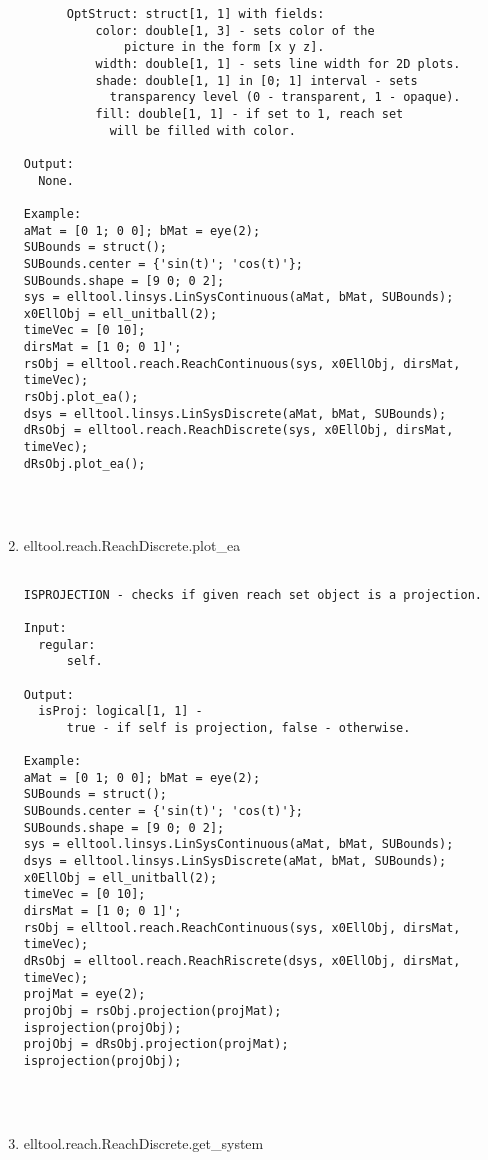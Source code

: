 \begin{enumerate}
\begin{lstlisting}
      OptStruct: struct[1, 1] with fields:
          color: double[1, 3] - sets color of the
              picture in the form [x y z].
          width: double[1, 1] - sets line width for 2D plots.
          shade: double[1, 1] in [0; 1] interval - sets
            transparency level (0 - transparent, 1 - opaque).
          fill: double[1, 1] - if set to 1, reach set
            will be filled with color.

Output:
  None.

Example:
aMat = [0 1; 0 0]; bMat = eye(2);
SUBounds = struct();
SUBounds.center = {'sin(t)'; 'cos(t)'};
SUBounds.shape = [9 0; 0 2];
sys = elltool.linsys.LinSysContinuous(aMat, bMat, SUBounds);
x0EllObj = ell_unitball(2);
timeVec = [0 10];
dirsMat = [1 0; 0 1]';
rsObj = elltool.reach.ReachContinuous(sys, x0EllObj, dirsMat, timeVec);
rsObj.plot_ea();
dsys = elltool.linsys.LinSysDiscrete(aMat, bMat, SUBounds);
dRsObj = elltool.reach.ReachDiscrete(sys, x0EllObj, dirsMat, timeVec);
dRsObj.plot_ea();




\end{lstlisting}
\fontfamily{\familydefault}
\selectfont
\item {elltool.reach.ReachDiscrete.plot\_ea}
\selectfont
\begin{lstlisting}

ISPROJECTION - checks if given reach set object is a projection.

Input:
  regular:
      self.

Output:
  isProj: logical[1, 1] -
      true - if self is projection, false - otherwise.

Example:
aMat = [0 1; 0 0]; bMat = eye(2);
SUBounds = struct();
SUBounds.center = {'sin(t)'; 'cos(t)'};
SUBounds.shape = [9 0; 0 2];
sys = elltool.linsys.LinSysContinuous(aMat, bMat, SUBounds);
dsys = elltool.linsys.LinSysDiscrete(aMat, bMat, SUBounds);
x0EllObj = ell_unitball(2);
timeVec = [0 10];
dirsMat = [1 0; 0 1]';
rsObj = elltool.reach.ReachContinuous(sys, x0EllObj, dirsMat, timeVec);
dRsObj = elltool.reach.ReachRiscrete(dsys, x0EllObj, dirsMat, timeVec);
projMat = eye(2);
projObj = rsObj.projection(projMat);
isprojection(projObj);
projObj = dRsObj.projection(projMat);
isprojection(projObj);




\end{lstlisting}
\fontfamily{\familydefault}
\selectfont
\item {elltool.reach.ReachDiscrete.get\_system}
\selectfont
\begin{lstlisting}


\end{lstlisting}
\end{enumerate}
